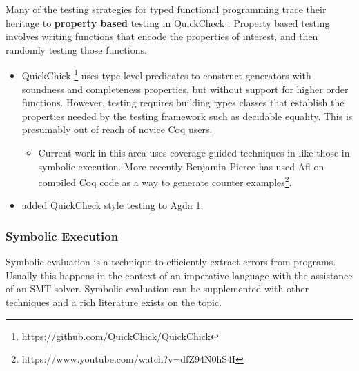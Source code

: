 Many of the testing strategies for typed functional programming trace
their heritage to \textbf{property based} testing in QuickCheck \cite{quickcheck}.
Property based testing involves writing functions that encode the
properties of interest, and then randomly testing those functions.
\begin{itemize}
\item QuickChick \footnote{https://github.com/QuickChick/QuickChick} \cite{denes2014quickchick}\cite{lampropoulos2017generating,lampropoulos2017beginner,lampropoulos2018random}
uses type-level predicates to construct generators with soundness
and completeness properties, but without support for higher order
functions. However, testing requires building types classes that establish
the properties needed by the testing framework such as decidable equality.
This is presumably out of reach of novice Coq users.
\begin{itemize}
\item Current work in this area uses coverage guided techniques in \cite{lampropoulos2019coverage}
like those in symbolic execution. More recently Benjamin Pierce has
used Afl on compiled Coq code as a way to generate counter examples\footnote{https://www.youtube.com/watch?v=dfZ94N0hS4I}.
\end{itemize}
\item \cite{dybjer2003combining} added QuickCheck style testing to Agda
1.
\end{itemize}

\subsubsection{Symbolic Execution}

Symbolic evaluation is a technique to efficiently extract errors from
programs. Usually this happens in the context of an imperative language
with the assistance of an SMT solver. Symbolic evaluation can be supplemented
with other techniques and a rich literature exists on the topic. 

